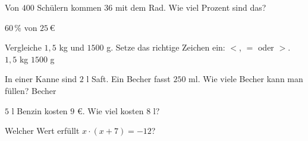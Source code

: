 \documentclass[11pt]{article}
\begin{document}
\noindent\begin{minipage}[t]{0.485\linewidth}\raggedright
\begin{aufgabe}{Von $400$ Schülern kommen $36$ mit dem Rad. Wie viel Prozent sind das? \leerfeld[\%]}
\end{aufgabe}
\end{minipage}\hfill\begin{minipage}[t]{0.485\linewidth}\raggedright
\begin{aufgabe}{$60\,\%$ von $25\,€$ \leerfeld[€]}
\end{aufgabe}
\end{minipage}\par

\noindent\begin{minipage}[t]{0.485\linewidth}\raggedright
\begin{aufgabe}{Vergleiche $1{,}5$ kg und $1500$ g. Setze das richtige Zeichen ein: $<$, $=$ oder $>$. $1{,}5$ kg \leerfeld $1500$ g}
\end{aufgabe}
\end{minipage}\hfill\begin{minipage}[t]{0.485\linewidth}\raggedright
\begin{aufgabe}{In einer Kanne sind $2$ l Saft. Ein Becher fasst $250$ ml. Wie viele Becher kann man füllen? \leerfeld Becher}
\end{aufgabe}
\end{minipage}\par

\noindent\begin{minipage}[t]{0.485\linewidth}\raggedright
\begin{aufgabe}{$5$ l Benzin kosten $9$ €. Wie viel kosten $8$ l? \leerfeld[€]}
\end{aufgabe}
\end{minipage}\hfill\begin{minipage}[t]{0.485\linewidth}\raggedright
\begin{aufgabe}{Welcher Wert erfüllt $x \cdot (x + 7) = -12$? \\    }
\end{aufgabe}
\end{minipage}\par
\end{document}
